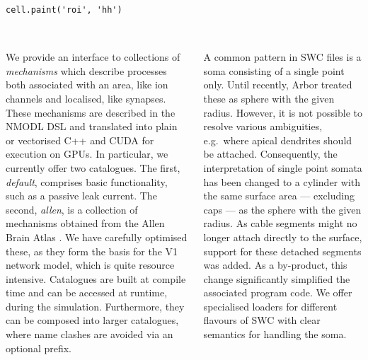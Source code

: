 \documentclass{beamer}
\begin{document}
\begin{frame}[t, fragile]
\begin{columns}[onlytextwidth,T]
\begin{column}{0.3\textwidth}
\begin{verbatim}
cell.paint('roi', 'hh')
\end{verbatim}
    \end{column}
  \end{columns}
  \vspace*{2ex}
  \begin{columns}[onlytextwidth,T]
    \begin{column}{.49\linewidth}
      \textbf{}\\
      We provide an interface to collections of \emph{mechanisms} which describe
      processes both associated with an area, like ion channels and
      localised, like synapses. These mechanisms are described in the NMODL DSL
      and translated into plain or vectorised C++ and CUDA for execution on GPUs.
      In particular, we currently offer two catalogues. The first, \emph{default},
      comprises basic functionality, such as a passive leak current.
      The second, \emph{allen}, is a collection of mechanisms
      obtained from the Allen Brain Atlas \cite{mouse-atlas}. We have carefully
      optimised these, as they form the basis for the V1 network model, which is
      quite resource intensive. Catalogues are built at compile time and can be
      accessed at runtime, during the simulation. Furthermore, they can be composed
      into larger catalogues, where name clashes are avoided via an optional prefix.
    \end{column}
    \begin{column}{.49\linewidth}
      \textbf{}\\
      A common pattern in SWC files is a soma consisting of a single point only.
      Until recently, Arbor treated these as sphere with the given radius.
      However, it is not possible to resolve various ambiguities, e.g.\ where
      apical dendrites should be attached. Consequently, the interpretation of
      single point somata has been changed to a cylinder with the same surface
      area --- excluding caps --- as the sphere with the given radius. As cable
      segments might no longer attach directly to the surface, support for these
      detached segments was added. As a by-product, this change significantly
      simplified the associated program code. We offer specialised loaders for
      different flavours of SWC with clear semantics for handling the soma.
    \end{column}
  \end{columns}
  \vspace*{2ex}
  \textbf{{\large{}}}\\

\end{frame}
\end{document}
